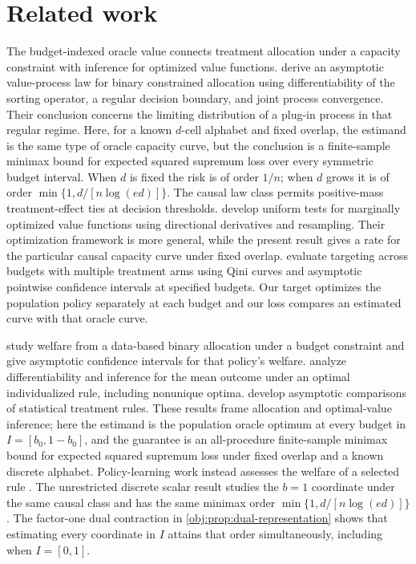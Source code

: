\section{Related work}

The budget-indexed oracle value connects treatment allocation under a capacity constraint with inference for optimized value functions. \citet[Assumptions 4.1.1--4.1.3 and Theorem 4.1.1]{FengHongNekipelov2026} derive an asymptotic value-process law for binary constrained allocation using differentiability of the sorting operator, a regular decision boundary, and joint process convergence. Their conclusion concerns the limiting distribution of a plug-in process in that regular regime. Here, for a known \(d\)-cell alphabet and fixed overlap, the estimand is the same type of oracle capacity curve, but the conclusion is a finite-sample minimax bound for expected squared supremum loss over every symmetric budget interval. When \(d\) is fixed the risk is of order \(1/n\); when \(d\) grows it is of order \(\min\{1,d/[n\log(ed)]\}\). The causal law class permits positive-mass treatment-effect ties at decision thresholds. \citet[Section~4]{FirpoGalvaoParker2023} develop uniform tests for marginally optimized value functions using directional derivatives and resampling. Their optimization framework is more general, while the present result gives a rate for the particular causal capacity curve under fixed overlap. \citet[Sections~3.1 and~5]{SverdrupWuAtheyWager2025} evaluate targeting across budgets with multiple treatment arms using Qini curves and asymptotic pointwise confidence intervals at specified budgets. Our target optimizes the population policy separately at each budget and our loss compares an estimated curve with that oracle curve.

\citet[Section~5]{BhattacharyaDupas2012} study welfare from a data-based binary allocation under a budget constraint and give asymptotic confidence intervals for that policy's welfare. \citet[Sections~3 and~5]{LuedtkeVanDerLaan2016} analyze differentiability and inference for the mean outcome under an optimal individualized rule, including nonunique optima. \citet[Introduction]{Hirano2009} develop asymptotic comparisons of statistical treatment rules. These results frame allocation and optimal-value inference; here the estimand is the population oracle optimum at every budget in \(I=[b_0,1-b_0]\), and the guarantee is an all-procedure finite-sample minimax bound for expected squared supremum loss under fixed overlap and a known discrete alphabet. Policy-learning work instead assesses the welfare of a selected rule \citep{KitagawaTetenov2018,AtheyWager2021,Pellatt2023}. The unrestricted discrete scalar result \citep{CausalSmithUnrestricted2026} studies the \(b=1\) coordinate under the same causal class and has the same minimax order \(\min\{1,d/[n\log(ed)]\}\). The factor-one dual contraction in \cref{obj:prop:dual-representation} shows that estimating every coordinate in \(I\) attains that order simultaneously, including when \(I=[0,1]\).

